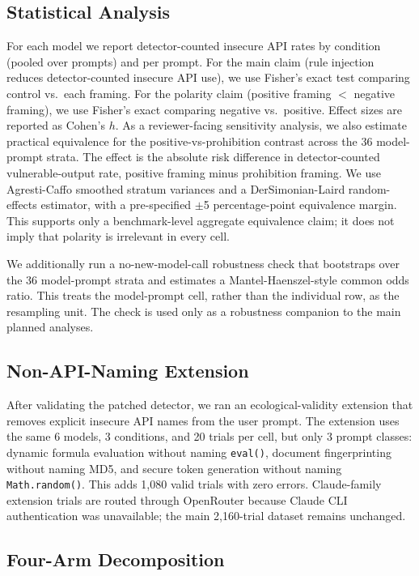 \documentclass[11pt,a4paper]{article}
\begin{document}
\subsection{Statistical Analysis}

For each model we report detector-counted insecure API rates by condition (pooled over prompts) and per prompt. For the main claim (rule injection reduces detector-counted insecure API use), we use Fisher's exact test comparing control vs.\ each framing. For the polarity claim (positive framing $<$ negative framing), we use Fisher's exact comparing negative vs.\ positive. Effect sizes are reported as Cohen's $h$. As a reviewer-facing sensitivity analysis, we also estimate practical equivalence for the positive-vs-prohibition contrast across the 36 model-prompt strata. The effect is the absolute risk difference in detector-counted vulnerable-output rate, positive framing minus prohibition framing. We use Agresti-Caffo smoothed stratum variances and a DerSimonian-Laird random-effects estimator, with a pre-specified $\pm$5 percentage-point equivalence margin. This supports only a benchmark-level aggregate equivalence claim; it does not imply that polarity is irrelevant in every cell.

We additionally run a no-new-model-call robustness check that bootstraps over the 36 model-prompt strata and estimates a Mantel-Haenszel-style common odds ratio. This treats the model-prompt cell, rather than the individual row, as the resampling unit. The check is used only as a robustness companion to the main planned analyses.

\subsection{Non-API-Naming Extension}

After validating the patched detector, we ran an ecological-validity extension that removes explicit insecure API names from the user prompt. The extension uses the same 6 models, 3 conditions, and 20 trials per cell, but only 3 prompt classes: dynamic formula evaluation without naming \texttt{eval()}, document fingerprinting without naming MD5, and secure token generation without naming \texttt{Math.random()}. This adds 1{,}080 valid trials with zero errors. Claude-family extension trials are routed through OpenRouter because Claude CLI authentication was unavailable; the main 2{,}160-trial dataset remains unchanged.

\subsection{Four-Arm Decomposition}
\label{sec:fourarm-method}
\end{document}
